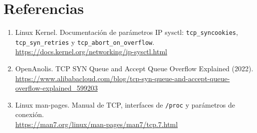 \documentclass[letterpaper,11pt]{article}
\begin{document}
\section{Referencias}
\begin{enumerate}
\item Linux Kernel. Documentación de parámetros IP sysctl: \texttt{tcp\_syncookies}, \texttt{tcp\_syn\_retries} y \texttt{tcp\_abort\_on\_overflow}.\\
\url{https://docs.kernel.org/networking/ip-sysctl.html}
\item OpenAnolis. TCP SYN Queue and Accept Queue Overflow Explained (2022).\\
\url{https://www.alibabacloud.com/blog/tcp-syn-queue-and-accept-queue-overflow-explained_599203}
\item Linux man-pages. Manual de TCP, interfaces de \texttt{/proc} y parámetros de conexión.\\
\url{https://man7.org/linux/man-pages/man7/tcp.7.html}
\end{enumerate}
\end{document}
